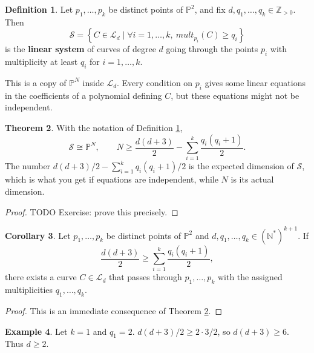 \documentclass{article}
\newcommand{\N}{\mathbb{N}}
\newcommand{\Z}{\mathbb{Z}}
\renewcommand{\P}{\mathbb{P}}
\newcommand{\rb}[1]{\left( #1 \right)}
\newcommand{\cb}[1]{\left\{ #1 \right\}}
\theoremstyle{definition}\newtheorem{definition}{Definition}[section]
\theoremstyle{definition}\newtheorem{notation}[definition]{Notation}
\theoremstyle{definition}\newtheorem{remark}[definition]{Remark}
\theoremstyle{definition}\newtheorem{example}[definition]{Example}
\theoremstyle{definition}\newtheorem{fact}{Fact}
\theoremstyle{definition}\newtheorem{exercise}{Exercise}
\newtheorem{theorem}[definition]{Theorem}
\newtheorem{corollary}[definition]{Corollary}
\begin{document}

\begin{definition}
\label{def:14.7}
Let $ p_1, \dots, p_k $ be distinct points of $ \P^2 $, and fix $ d, q_1, \dots, q_k \in \Z_{> 0} $. Then
$$ \mathcal{S} = \cb{C \in \mathcal{L}_d \mid \forall i = 1, \dots, k, \ mult_{p_i}\rb{C} \ge q_i} $$
is the \textbf{linear system} of curves of degree $ d $ going through the points $ p_i $ with multiplicity at least $ q_i $ for $ i = 1, \dots, k $.
\end{definition}

This is a copy of $ \P^N $ inside $ \mathcal{L}_d $. Every condition on $ p_i $ gives some linear equations in the coefficients of a polynomial defining $ C $, but these equations might not be independent.

\begin{theorem}
\label{thm:14.8}
With the notation of Definition \ref{def:14.7},
$$ \mathcal{S} \cong \P^N, \qquad N \ge \dfrac{d\rb{d + 3}}{2} - \sum_{i = 1}^k \dfrac{q_i\rb{q_i + 1}}{2}. $$
The number $ d\rb{d + 3} / 2 - \sum_{i = 1}^k q_i\rb{q_i + 1} / 2 $ is the expected dimension of $ \mathcal{S} $, which is what you get if equations are independent, while $ N $ is its actual dimension.
\end{theorem}

\begin{proof}
TODO Exercise: prove this precisely.
\end{proof}

\begin{corollary}
Let $ p_1, \dots, p_k $ be distinct points of $ \P^2 $ and $ d, q_1, \dots, q_k \in \rb{\N^*}^{k + 1} $. If
$$ \dfrac{d\rb{d + 3}}{2} \ge \sum_{i = 1}^k \dfrac{q_i\rb{q_i + 1}}{2}, $$
there exists a curve $ C \in \mathcal{L}_d $ that passes through $ p_1, \dots, p_k $ with the assigned multiplicities $ q_1, \dots, q_k $.
\end{corollary}

\begin{proof}
This is an immediate consequence of Theorem \ref{thm:14.8}.
\end{proof}

\begin{example}
Let $ k = 1 $ and $ q_1 = 2 $. $ d\rb{d + 3} / 2 \ge 2 \cdot 3 / 2 $, so $ d\rb{d + 3} \ge 6 $. Thus $ d \ge 2 $.
\end{example}
\end{document}
